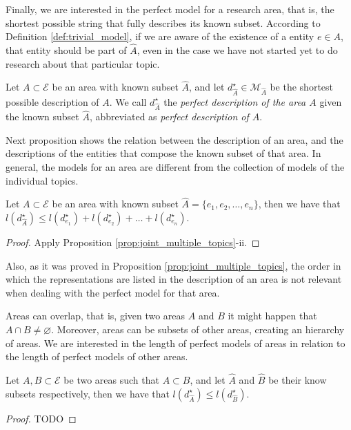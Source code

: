Finally, we are interested in the perfect model for a research area, that is, the shortest possible string that fully describes its known subset. According to Definition \ref{def:trivial_model}, if we are aware of the existence of a entity $e \in A$, that entity should be part of $\hat{A}$, even in the case we have not started yet to do research about that particular topic.

\begin{definition}
Let $A \subset \mathcal{E}$ be an area with known subset $\hat{A}$, and let $d_{\hat{A}}^{\star} \in \mathcal{M}_{\hat{A}}$ be the shortest possible description of $A$. We call  $d_{\hat{A}}^{\star}$ the \emph{perfect description of the area $A$} given the known subset $\hat{A}$, abbreviated as \emph{perfect description of $A$}.
\end{definition}

Next proposition shows the relation between the description of an area, and the descriptions of the entities that compose the known subset of that area. In general, the models for an area are different from the collection of models of the individual topics.

\begin{proposition}
Let $A \subset \mathcal{E}$ be an area with known subset $\hat{A} = \{e_1, e_2, \ldots, e_n\}$, then we have that $l \left( d_{\hat{A}}^{\star} \right) \leq l(d_ {e_1}^\star) + l(d_ {e_2}^\star) + \ldots + l(d_ {e_n}^\star)$.
\end{proposition}
\begin{proof}
Apply Proposition \ref{prop:joint_multiple_topics}-ii. 
\end{proof}

Also, as it was proved in Proposition \ref{prop:joint_multiple_topics}, the order in which the representations are listed in the description of an area is not relevant when dealing with the perfect model for that area.

Areas can overlap, that is, given two areas $A$ and $B$ it might happen that $A \cap B \neq \varnothing$. Moreover, areas can be subsets of other areas, creating an hierarchy of areas. We are interested in the length of perfect models of areas in relation to the length of perfect models of other areas.

\begin{proposition}
Let $A, B \subset \mathcal{E}$ be two areas such that $A \subset B$, and let $\hat{A}$ and $\hat{B}$ be their know subsets respectively, then we have that $l \left( d_{\hat{A}}^{\star} \right) \leq l \left( d_{\hat{B}}^{\star} \right)$.
\end{proposition}
\begin{proof}
{\color{red} TODO}
\end{proof}

